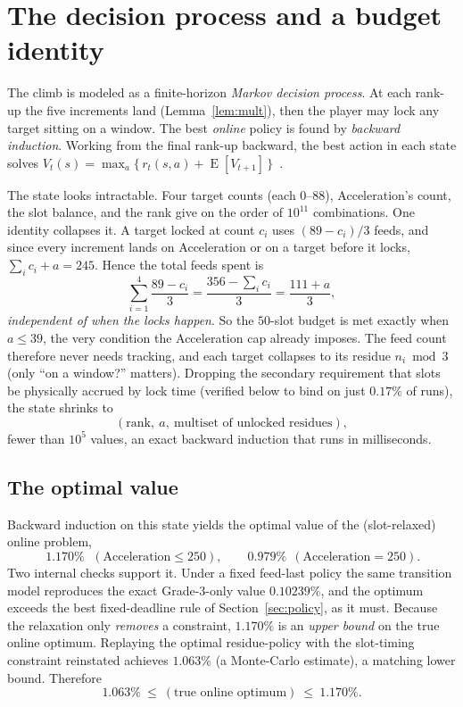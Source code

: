 \documentclass[11pt]{article}
\theoremstyle{remark}
\newcommand{\E}{\operatorname{E}}
\begin{document}
\section{The decision process and a budget identity}\label{sec:mdp}

The climb is modeled as a finite-horizon \emph{Markov decision process}. At each rank-up
the five increments land (Lemma~\ref{lem:mult}), then the player may lock any target
sitting on a window. The best \emph{online} policy is found by \emph{backward
induction}. Working from the final rank-up backward, the best action in each state
solves $V_t(s)=\max_a\{\,r_t(s,a)+\E[V_{t+1}]\,\}$~\cite{mdp}.

The state looks intractable. Four target counts (each $0$--$88$), Acceleration's count,
the slot balance, and the rank give on the order of $10^{11}$ combinations. One identity
collapses it. A target locked at count $c_i$ uses $(89-c_i)/3$ feeds, and since every
increment lands on Acceleration or on a target before it locks, $\sum_i c_i + a = 245$.
Hence the total feeds spent is
\begin{equation}\label{eq:budget}
   \sum_{i=1}^{4}\frac{89-c_i}{3}=\frac{356-\sum_i c_i}{3}=\frac{111+a}{3},
\end{equation}
\emph{independent of when the locks happen}. So the $50$-slot budget is met exactly when
$a\le 39$, the very condition the Acceleration cap already imposes. The feed count
therefore never needs tracking, and each target collapses to its residue $n_i\bmod 3$
(only ``on a window?'' matters). Dropping the secondary requirement that slots be
physically accrued by lock time (verified below to bind on just $0.17\%$ of runs), the
state shrinks to
\[
   (\text{rank},\ a,\ \text{multiset of unlocked residues}),
\]
fewer than $10^{5}$ values, an exact backward induction that runs in milliseconds.

\subsection{The optimal value}
Backward induction on this state yields the optimal value of the (slot-relaxed) online
problem,
\[
   \boxed{\,1.170\%\,}\ \ (\text{Acceleration}\le 250),\qquad 0.979\%\ \ (\text{Acceleration}=250).
\]
Two internal checks support it. Under a fixed feed-last policy the same transition model
reproduces the exact Grade-3-only value $0.10239\%$, and the optimum exceeds the best
fixed-deadline rule of Section~\ref{sec:policy}, as it must. Because the relaxation only
\emph{removes} a constraint, $1.170\%$ is an \emph{upper bound} on the true online
optimum. Replaying the optimal residue-policy with the slot-timing constraint reinstated
achieves $1.063\%$ (a Monte-Carlo estimate), a matching lower bound. Therefore
\[
   1.063\%\ \le\ (\text{true online optimum})\ \le\ 1.170\%.
\]
\end{document}
